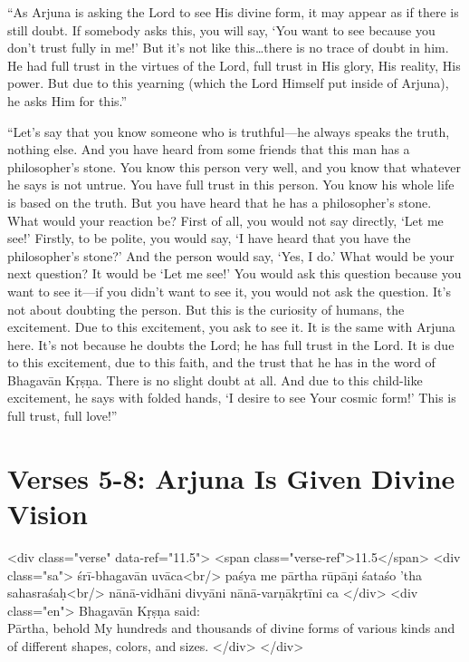 \enquote{As Arjuna is asking the Lord to see His divine form, it may appear as if there is still doubt. If somebody asks this, you will say, \enquote{You want to see because you don’t trust fully in me!} But it’s not like this\ldots there is no trace of doubt in him. He had full trust in the virtues of the Lord, full trust in His glory, His reality, His power. But due to this yearning (which the Lord Himself put inside of Arjuna), he asks Him for this.}

\enquote{Let’s say that you know someone who is truthful---he always speaks the truth, nothing else. And you have heard from some friends that this man has a philosopher’s stone. You know this person very well, and you know that whatever he says is not untrue. You have full trust in this person. You know his whole life is based on the truth. But you have heard that he has a philosopher’s stone. What would your reaction be? First of all, you would not say directly, \enquote{Let me see!} Firstly, to be polite, you would say, \enquote{I have heard that you have the philosopher’s stone?} And the person would say, \enquote{Yes, I do.} What would be your next question? It would be \enquote{Let me see!} You would ask this question because you want to see it---if you didn’t want to see it, you would not ask the question. It’s not about doubting the person. But this is the curiosity of humans, the excitement. Due to this excitement, you ask to see it. It is the same with Arjuna here. It’s not because he doubts the Lord; he has full trust in the Lord. It is due to this excitement, due to this faith, and the trust that he has in the word of Bhagavān Kṛṣṇa. There is no slight doubt at all. And due to this child-like excitement, he says with folded hands, \enquote{I desire to see Your cosmic form!} This is full trust, full love!}

\section{Verses 5-8: Arjuna Is Given Divine Vision}\label{sec-verses-5-8-arjuna-is-given-divine-vision}


\begin{html}
<div class="verse" data-ref="11.5">
  <span class="verse-ref">11.5</span>
  <div class="sa">
    śrī-bhagavān uvāca<br/>
    paśya me pārtha rūpāṇi śataśo ’tha sahasraśaḥ<br/>
    nānā-vidhāni divyāni nānā-varṇākṛtīni ca
  </div>
  <div class="en">
    \hspace*{1em}Bhagavān Kṛṣṇa said: \\ Pārtha, behold My hundreds and thousands of divine forms of various kinds and of different shapes, colors, and sizes.
  </div>
</div>
\end{html}



